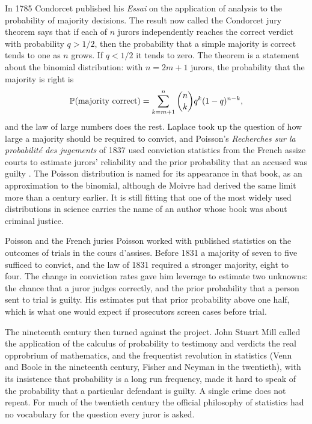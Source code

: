 In 1785 Condorcet published his \emph{Essai} on the application of analysis to the probability of majority decisions. The result now called the Condorcet jury theorem says that if each of $n$ jurors independently reaches the correct verdict with probability $q > 1/2$, then the probability that a simple majority is correct tends to one as $n$ grows. If $q < 1/2$ it tends to zero. The theorem is a statement about the binomial distribution: with $n = 2m+1$ jurors, the probability that the majority is right is
\begin{equation}
\mathbb{P}(\text{majority correct}) = \sum_{k=m+1}^{n} \binom{n}{k} q^{k}(1-q)^{n-k},
\label{eq:condorcet}
\end{equation}
and the law of large numbers does the rest. Laplace took up the question of how large a majority should be required to convict, and Poisson's \emph{Recherches sur la probabilit\'e des jugements} of 1837 used conviction statistics from the French assize courts to estimate jurors' reliability and the prior probability that an accused was guilty \citep{poisson1837}. The Poisson distribution is named for its appearance in that book, as an approximation to the binomial, although de Moivre had derived the same limit more than a century earlier. It is still fitting that one of the most widely used distributions in science carries the name of an author whose book was about criminal justice.

\begin{casebox}{Poisson and the French juries}
Poisson worked with published statistics on the outcomes of trials in the cours d'assises. Before 1831 a majority of seven to five sufficed to convict, and the law of 1831 required a stronger majority, eight to four. The change in conviction rates gave him leverage to estimate two unknowns: the chance that a juror judges correctly, and the prior probability that a person sent to trial is guilty. His estimates put that prior probability above one half, which is what one would expect if prosecutors screen cases before trial.
\end{casebox}

The nineteenth century then turned against the project. John Stuart Mill called the application of the calculus of probability to testimony and verdicts the real opprobrium of mathematics, and the frequentist revolution in statistics (Venn and Boole in the nineteenth century, Fisher and Neyman in the twentieth), with its insistence that probability is a long run frequency, made it hard to speak of the probability that a particular defendant is guilty. A single crime does not repeat. For much of the twentieth century the official philosophy of statistics had no vocabulary for the question every juror is asked.

